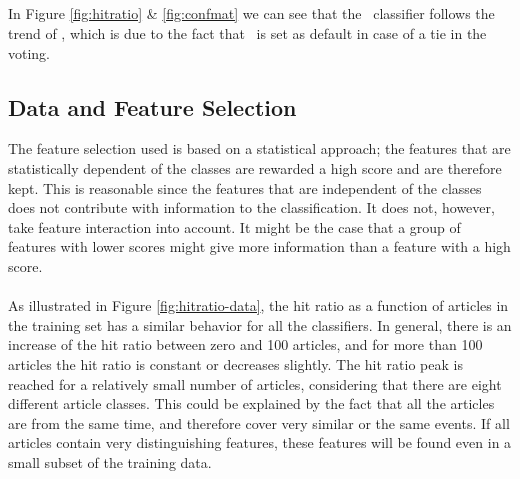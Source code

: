 \subsection{\hy}
In Figure \ref{fig:hitratio} \& \ref{fig:confmat} we can see that the \hy\ classifier follows the trend of \mn, which is due to the fact that \mn\ is set as default in case of a tie in the voting.

\subsection{Data and Feature Selection}
The feature selection used is based on a statistical approach; the features that are statistically dependent of the classes are rewarded a high score and are therefore kept. This is reasonable since the features that are independent of the classes does not contribute with information to the classification. It does not, however, take feature interaction into account. It might be the case that a group of features with lower scores might give more information than a feature with a high score. 
\\\\
As illustrated in Figure \ref{fig:hitratio-data}, the hit ratio as a function of articles in the training set has a similar behavior for all the classifiers. In general, there is an increase of the hit ratio between zero and 100 articles, and for more than 100 articles the hit ratio is constant or decreases slightly. The hit ratio peak is reached for a relatively small number of articles, considering that there are eight different article classes. This could be explained by the fact that all the articles are from the same time, and therefore cover very similar or the same events. If all articles contain very distinguishing features, these features will be found even in a small subset of the training data.


